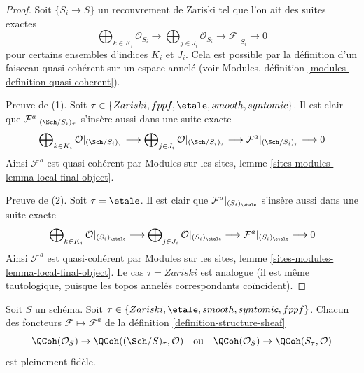 \begin{proof}
Soit $\{S_i \to S\}$ un recouvrement de Zariski tel que l'on ait des
suites exactes
$$
\bigoplus\nolimits_{k \in K_i} \mathcal{O}_{S_i} \longrightarrow
\bigoplus\nolimits_{j \in J_i} \mathcal{O}_{S_i} \longrightarrow
\mathcal{F}|_{S_i} \longrightarrow 0
$$
pour certains ensembles d'indices $K_i$ et $J_i$. Cela est possible par
la définition d'un faisceau quasi-cohérent sur un espace annelé
(voir Modules, définition \ref{modules-definition-quasi-coherent}).

\medskip\noindent
Preuve de (1). Soit $\tau \in \{Zariski, \linebreak[0] fppf, \linebreak[0]
\etale, \linebreak[0] smooth, \linebreak[0] syntomic\}$.
Il est clair que $\mathcal{F}^a|_{(\Sch/S_i)_\tau}$ s'insère aussi dans
une suite exacte
$$
\bigoplus\nolimits_{k \in K_i} \mathcal{O}|_{(\Sch/S_i)_\tau}
\longrightarrow
\bigoplus\nolimits_{j \in J_i} \mathcal{O}|_{(\Sch/S_i)_\tau}
\longrightarrow
\mathcal{F}^a|_{(\Sch/S_i)_\tau} \longrightarrow 0
$$
Ainsi $\mathcal{F}^a$ est quasi-cohérent par Modules sur les sites,
lemme \ref{sites-modules-lemma-local-final-object}.

\medskip\noindent
Preuve de (2). Soit $\tau = \etale$. Il est clair que
$\mathcal{F}^a|_{(S_i)_\etale}$ s'insère aussi dans une suite exacte
$$
\bigoplus\nolimits_{k \in K_i} \mathcal{O}|_{(S_i)_\etale}
\longrightarrow
\bigoplus\nolimits_{j \in J_i} \mathcal{O}|_{(S_i)_\etale}
\longrightarrow
\mathcal{F}^a|_{(S_i)_\etale} \longrightarrow 0
$$
Ainsi $\mathcal{F}^a$ est quasi-cohérent par Modules sur les sites,
lemme \ref{sites-modules-lemma-local-final-object}.
Le cas $\tau = Zariski$ est analogue (il est même tautologique, puisque
les topos annelés correspondants coïncident).
\end{proof}

\begin{lemma}
\label{lemma-fully-faithful-associated}
Soit $S$ un schéma.
Soit $\tau \in \{Zariski, \linebreak[0] \etale, \linebreak[0]
smooth, \linebreak[0] syntomic, \linebreak[0] fppf\}$.
Chacun des foncteurs $\mathcal{F} \mapsto \mathcal{F}^a$ de la
définition \ref{definition-structure-sheaf}
$$
\QCoh(\mathcal{O}_S) \to \QCoh((\Sch/S)_\tau, \mathcal{O})
\quad\text{ou}\quad
\QCoh(\mathcal{O}_S) \to \QCoh(S_\tau, \mathcal{O})
$$
est pleinement fidèle.
\end{lemma}


